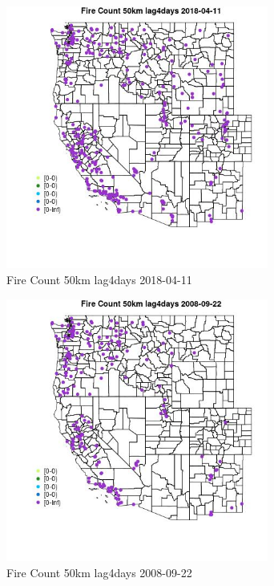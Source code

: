 \begin{figure} 
\centering  
\includegraphics[width=0.77\textwidth]{Code_Outputs/Report_ML_input_PM25_Step4_part_e_de_duplicated_aves_compiled_2019-05-18wNAs_MapObsFire_Count_50km_lag4days2018-04-11.jpg} 
\caption{\label{fig:Report_ML_input_PM25_Step4_part_e_de_duplicated_aves_compiled_2019-05-18wNAsMapObsFire_Count_50km_lag4days2018-04-11}Fire Count 50km lag4days 2018-04-11} 
\end{figure} 
 

\begin{figure} 
\centering  
\includegraphics[width=0.77\textwidth]{Code_Outputs/Report_ML_input_PM25_Step4_part_e_de_duplicated_aves_compiled_2019-05-18wNAs_MapObsFire_Count_50km_lag4days2008-09-22.jpg} 
\caption{\label{fig:Report_ML_input_PM25_Step4_part_e_de_duplicated_aves_compiled_2019-05-18wNAsMapObsFire_Count_50km_lag4days2008-09-22}Fire Count 50km lag4days 2008-09-22} 
\end{figure} 
 

